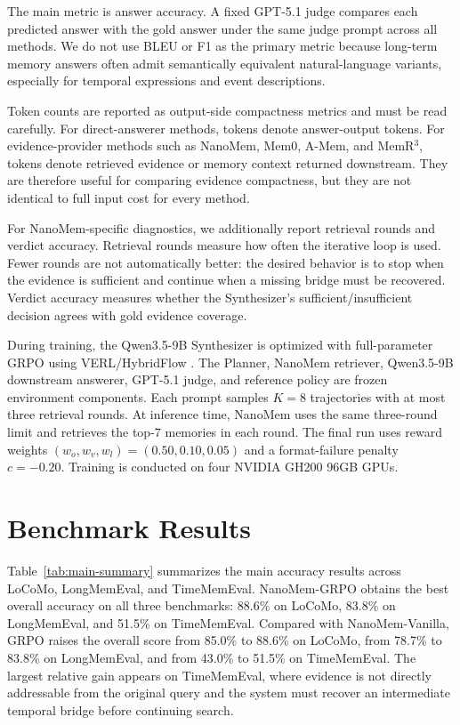 The main metric is answer accuracy. A fixed GPT-5.1 judge compares each
predicted answer with the gold answer under the same judge prompt across all
methods. We do not use BLEU or F1 as the primary metric because long-term memory
answers often admit semantically equivalent natural-language variants,
especially for temporal expressions and event descriptions.

Token counts are reported as output-side compactness metrics and must be read
carefully. For direct-answerer methods, tokens denote answer-output tokens. For
evidence-provider methods such as NanoMem, Mem0, A-Mem, and MemR$^3$, tokens
denote retrieved evidence or memory context returned downstream. They are
therefore useful for comparing evidence compactness, but they are not identical
to full input cost for every method.

For NanoMem-specific diagnostics, we additionally report retrieval rounds and
verdict accuracy. Retrieval rounds measure how often the iterative loop is used.
Fewer rounds are not automatically better: the desired behavior is to stop when
the evidence is sufficient and continue when a missing bridge must be recovered.
Verdict accuracy measures whether the Synthesizer's sufficient/insufficient
decision agrees with gold evidence coverage.

During training, the Qwen3.5-9B Synthesizer is optimized with full-parameter
GRPO using VERL/HybridFlow \cite{sheng2024hybridflow}. The Planner, NanoMem
retriever, Qwen3.5-9B downstream answerer, GPT-5.1 judge, and reference policy
are frozen environment components. Each prompt samples \(K=8\) trajectories with
at most three retrieval rounds. At inference time, NanoMem uses the same
three-round limit and retrieves the top-7 memories in each round. The final run
uses reward weights \((w_o,w_v,w_l)=(0.50,0.10,0.05)\) and a format-failure
penalty \(c=-0.20\). Training is conducted on four NVIDIA GH200 96GB GPUs.

\section{Benchmark Results}
\label{sec:benchmark-results}
\label{app:main-benchmark-results}

Table~\ref{tab:main-summary} summarizes the main accuracy results
across LoCoMo, LongMemEval, and TimeMemEval. NanoMem-GRPO obtains the best
overall accuracy on all three benchmarks: 88.6\% on LoCoMo, 83.8\% on
LongMemEval, and 51.5\% on TimeMemEval. Compared with NanoMem-Vanilla, GRPO
raises the overall score from 85.0\% to 88.6\% on LoCoMo, from 78.7\% to
83.8\% on LongMemEval, and from 43.0\% to 51.5\% on TimeMemEval. The largest
relative gain appears on TimeMemEval, where evidence is not directly
addressable from the original query and the system must recover an intermediate
temporal bridge before continuing search.

